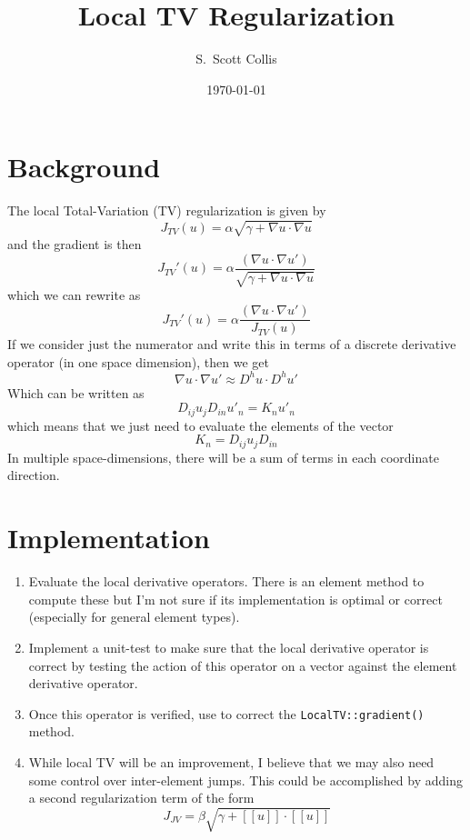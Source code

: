 \documentclass[11pt]{amsart}
\title{Local TV Regularization}
\author{S.\ Scott Collis}
\date{\today}
\begin{document}
\maketitle

\section{Background}
The local Total-Variation (TV) regularization is given by
\[ J_{TV}(u) = \alpha \sqrt{ \gamma + \nabla u \cdot \nabla u}  \]
and the gradient is then
\[ J_{TV}'(u) = \alpha \frac{\left( \nabla u \cdot \nabla u' \right)}
{\sqrt{\gamma + \nabla u \cdot \nabla u}} \]
which we can rewrite as
\[ J_{TV}'(u) = \alpha \frac{\left( \nabla u \cdot \nabla u' \right)}
{J_{TV}(u)} \]
If we consider just the numerator and write this in terms of a discrete derivative operator (in one space dimension), then we get
\[ \nabla u \cdot \nabla u' \approx D^h u \cdot D^h u' \]
Which can be written as
\[ D_{ij} u_j D_{in} u'_{n} = K_n u'_{n} \]
which means that we just need to evaluate the elements of the vector 
\[ K_n = D_{ij} u_j D_{in} \]
In multiple space-dimensions, there will be a sum of terms in each coordinate direction.

\section{Implementation}
\begin{enumerate}
\item Evaluate the local derivative operators.  There is an element method to compute these but I'm not sure if its implementation is optimal or correct (especially for general element types).
\item Implement a unit-test to make sure that the local derivative operator is correct by testing the action of this operator on a vector against the element derivative operator.
\item Once this operator is verified, use to correct the \texttt{LocalTV::gradient()} method.
\item While local TV will be an improvement, I believe that we may also need some control over inter-element jumps.  This could be accomplished by adding a second regularization term of the form
\[ J_{JV} = \beta \sqrt{ \gamma + [[u]] \cdot [[u]] } \]
\end{enumerate}
\end{document}
